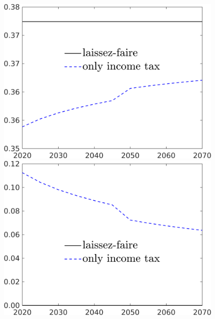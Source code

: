 \begin{figure}[h!!]
\begin{minipage}[]{0.32\textwidth}
	\end{minipage}
	\begin{minipage}[]{0.32\textwidth}
		\includegraphics[width=1\textwidth]{../../codding_model/own_basedOnFried/optimalPol_190722_tidiedUp/figures/all_10Aout22/CountTaul_modnsk_target_hh_spillover0_sep1_extern0_PV1_etaa0.79_lgd1.png}
	\end{minipage}
	\begin{minipage}[]{0.32\textwidth}
		\includegraphics[width=1\textwidth]{../../codding_model/own_basedOnFried/optimalPol_190722_tidiedUp/figures/all_10Aout22/CountTaul_modnsk_target_taul_spillover0_sep1_extern0_PV1_etaa0.79_lgd1.png}

\end{minipage}
\end{figure}
